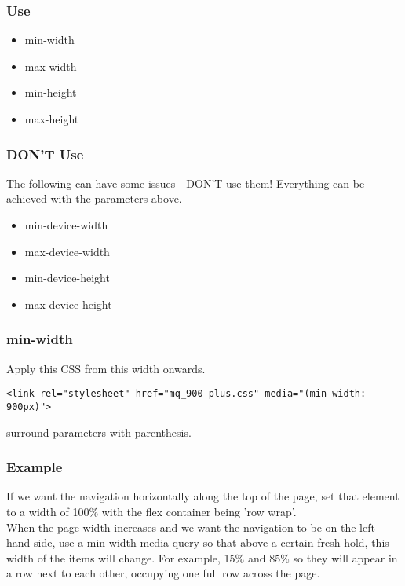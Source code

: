 \documentclass[]{article}
\begin{document}
\subsubsection{Use}
\begin{itemize}
	\item min-width
	\item max-width
	\item min-height
	\item max-height
\end{itemize}

\subsubsection{DON'T Use}
The following can have some issues - DON'T use them!  Everything can be achieved with the parameters above.
\begin{itemize}
	\item min-device-width
	\item max-device-width
	\item min-device-height
	\item max-device-height
\end{itemize}

\subsubsection{min-width}
Apply this CSS from this width onwards.
\begin{lstlisting}
<link rel="stylesheet" href="mq_900-plus.css" media="(min-width: 900px)">
\end{lstlisting}
surround parameters with parenthesis. 

\subsubsection{Example}
If we want the navigation horizontally along the top of the page, set that element to a width of 100\% with the flex container being 'row wrap'.  
\\
When the page width increases and we want the navigation to be on the left-hand side, use a min-width media query so that above a certain fresh-hold, this width of the items will change.  For example, 15\% and 85\% so they will appear in a row next to each other, occupying one full row across the page.
\end{document}
